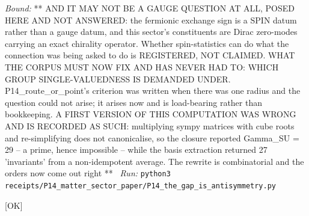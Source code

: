 \begin{description}
 \emph{Bound:} ** AND IT MAY NOT BE A GAUGE QUESTION AT ALL, POSED HERE AND NOT ANSWERED: the fermionic exchange sign is a SPIN datum rather than a gauge datum, and this sector's constituents are Dirac zero-modes carrying an exact chirality operator. Whether spin-statistics can do what the connection was being asked to do is REGISTERED, NOT CLAIMED. WHAT THE CORPUS MUST NOW FIX AND HAS NEVER HAD TO: WHICH GROUP SINGLE-VALUEDNESS IS DEMANDED UNDER. P14\_route\_or\_point's criterion was written when there was one radius and the question could not arise; it arises now and is load-bearing rather than bookkeeping. A FIRST VERSION OF THIS COMPUTATION WAS WRONG AND IS RECORDED AS SUCH: multiplying sympy matrices with cube roots and re-simplifying does not canonicalise, so the closure reported \textbar{}Gamma\_SU\textbar{} = 29 -- a prime, hence impossible -- while the basis extraction returned 27 'invariants' from a non-idempotent average. The rewrite is combinatorial and the orders now come out right **
\ \emph{Run:} \texttt{python3 receipts/P14\_matter\_sector\_paper/P14\_the\_gap\_is\_antisymmetry.py}
\item[\rcptlabel{P14_no_choice_of_group_works}{P14R31}\textbf{P14R31}\quad\texttt{P14\_no\_choice\_of\_group\_works}]\hfill\textsf{[OK]}\\

\end{description}
